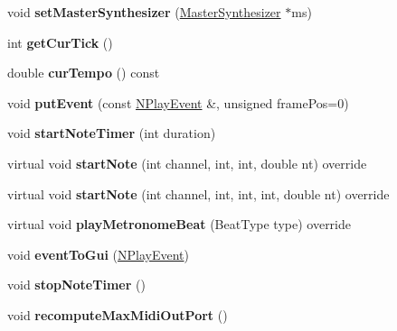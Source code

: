 \begin{DoxyCompactItemize}
void {\bfseries set\+Master\+Synthesizer} (\hyperlink{class_ms_1_1_master_synthesizer}{Master\+Synthesizer} $\ast$ms)
\item 
\mbox{\label{class_ms_1_1_seq_afd8a6262a62248949f5e460880bb74b5}} 
int {\bfseries get\+Cur\+Tick} ()
\item 
\mbox{\label{class_ms_1_1_seq_abc2256ab7f5af87bfddfab656e5c4638}} 
double {\bfseries cur\+Tempo} () const
\item 
\mbox{\label{class_ms_1_1_seq_a55a5f4c557cb99c1f5495721a1cc0c38}} 
void {\bfseries put\+Event} (const \hyperlink{class_ms_1_1_n_play_event}{N\+Play\+Event} \&, unsigned frame\+Pos=0)
\item 
\mbox{\label{class_ms_1_1_seq_a05abf505ed22849d72650734f48aaac9}} 
void {\bfseries start\+Note\+Timer} (int duration)
\item 
\mbox{\label{class_ms_1_1_seq_a6bfab5006b6bb7f4a92eca23b132a858}} 
virtual void {\bfseries start\+Note} (int channel, int, int, double nt) override
\item 
\mbox{\label{class_ms_1_1_seq_a63a693b5eaf86708feacb3224562d98d}} 
virtual void {\bfseries start\+Note} (int channel, int, int, int, double nt) override
\item 
\mbox{\label{class_ms_1_1_seq_a2c672a68273237eb7e211334e785b5d4}} 
virtual void {\bfseries play\+Metronome\+Beat} (Beat\+Type type) override
\item 
\mbox{\label{class_ms_1_1_seq_a192fd01bd6583956e278ded475bf749e}} 
void {\bfseries event\+To\+Gui} (\hyperlink{class_ms_1_1_n_play_event}{N\+Play\+Event})
\item 
\mbox{\label{class_ms_1_1_seq_acc4bb1c295d817ca705fc4086717aeb7}} 
void {\bfseries stop\+Note\+Timer} ()
\item 
\mbox{\label{class_ms_1_1_seq_ad5940c5c17d515c62f7d6bc3563ed821}} 
void {\bfseries recompute\+Max\+Midi\+Out\+Port} ()
\item 

\end{DoxyCompactItemize}
